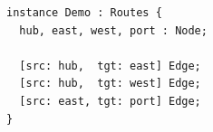 \begin{Verbatim}[fontsize=\small,frame=leftline,rulecolor=\color{accentmid},framesep=3mm,xleftmargin=3mm]
instance Demo : Routes {
  hub, east, west, port : Node;

  [src: hub,  tgt: east] Edge;
  [src: hub,  tgt: west] Edge;
  [src: east, tgt: port] Edge;
}
\end{Verbatim}
